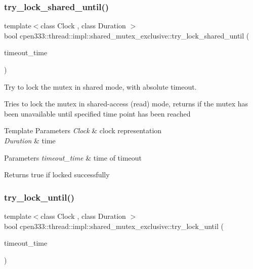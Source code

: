 \subsubsection{\texorpdfstring{try\+\_\+lock\+\_\+shared\+\_\+until()}{try\_lock\_shared\_until()}}
{\footnotesize\ttfamily template$<$class Clock , class Duration $>$ \\
bool cpen333\+::thread\+::impl\+::shared\+\_\+mutex\+\_\+exclusive\+::try\+\_\+lock\+\_\+shared\+\_\+until (\begin{DoxyParamCaption}\item[{const std\+::chrono\+::time\+\_\+point$<$ Clock, Duration $>$ \&}]{timeout\+\_\+time }\end{DoxyParamCaption})\hspace{0.3cm}{\ttfamily [inline]}}



Try to lock the mutex in shared mode, with absolute timeout. 

Tries to lock the mutex in shared-\/access (read) mode, returns if the mutex has been unavailable until specified time point has been reached


\begin{DoxyTemplParams}{Template Parameters}
{\em Clock} & clock representation \\
\hline
{\em Duration} & time \\
\hline
\end{DoxyTemplParams}

\begin{DoxyParams}{Parameters}
{\em timeout\+\_\+time} & time of timeout \\
\hline
\end{DoxyParams}
\begin{DoxyReturn}{Returns}
true if locked successfully 
\end{DoxyReturn}
\mbox{\label{classcpen333_1_1thread_1_1impl_1_1shared__mutex__exclusive_a99324f6fb6f6203faff33b1d41816998}} 
\subsubsection{\texorpdfstring{try\+\_\+lock\+\_\+until()}{try\_lock\_until()}}
{\footnotesize\ttfamily template$<$class Clock , class Duration $>$ \\
bool cpen333\+::thread\+::impl\+::shared\+\_\+mutex\+\_\+exclusive\+::try\+\_\+lock\+\_\+until (\begin{DoxyParamCaption}\item[{const std\+::chrono\+::time\+\_\+point$<$ Clock, Duration $>$ \&}]{timeout\+\_\+time }\end{DoxyParamCaption})\hspace{0.3cm}{\ttfamily [inline]}}



